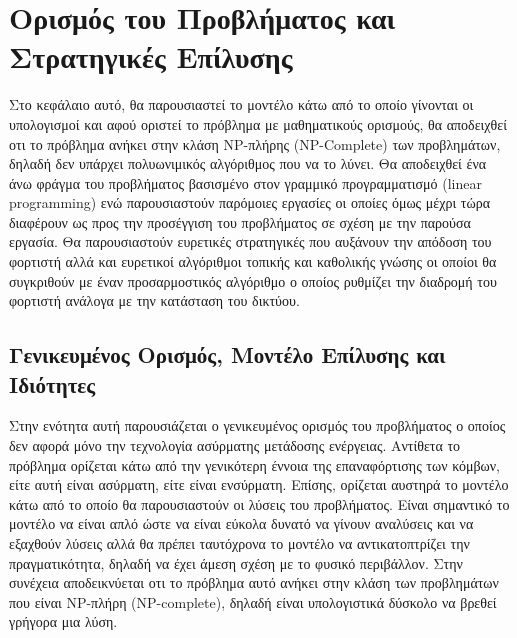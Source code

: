 

\chapter{Ορισμός του Προβλήματος και Στρατηγικές Επίλυσης} \label{ch:strategies_solution}
Στο κεφάλαιο αυτό, θα παρουσιαστεί το μοντέλο κάτω από το οποίο γίνονται οι υπολογισμοί και αφού οριστεί το πρόβλημα με μαθηματικούς ορισμούς, θα αποδειχθεί οτι το
πρόβλημα ανήκει στην κλάση NP-πλήρης (NP-Complete) των προβλημάτων, δηλαδή δεν υπάρχει πολυωνιμικός αλγόριθμος που να το λύνει. Θα αποδειχθεί ένα άνω φράγμα του
προβλήματος βασισμένο στον γραμμικό προγραμματισμό (linear programming) ενώ παρουσιαστούν παρόμοιες εργασίες οι οποίες όμως μέχρι τώρα διαφέρουν ως προς την
προσέγγιση του προβλήματος σε σχέση με την παρούσα εργασία. Θα παρουσιαστούν ευρετικές στρατηγικές που αυξάνουν την απόδοση του φορτιστή αλλά και ευρετικοί αλγόριθμοι
τοπικής και καθολικής γνώσης οι οποίοι θα συγκριθούν με έναν προσαρμοστικός αλγόριθμο ο οποίος ρυθμίζει την διαδρομή του φορτιστή ανάλογα με την κατάσταση του
δικτύου.


\section{Γενικευμένος Ορισμός, Μοντέλο Επίλυσης και Ιδιότητες}
Στην ενότητα αυτή παρουσιάζεται ο γενικευμένος ορισμός του προβλήματος ο οποίος δεν αφορά μόνο την τεχνολογία ασύρματης μετάδοσης ενέργειας. Αντίθετα το πρόβλημα
ορίζεται κάτω από την γενικότερη έννοια της επαναφόρτισης των κόμβων, είτε αυτή είναι ασύρματη, είτε είναι ενσύρματη. Επίσης, ορίζεται αυστηρά το μοντέλο κάτω από το
οποίο θα παρουσιαστούν οι λύσεις του προβλήματος. Είναι σημαντικό το μοντέλο να είναι απλό ώστε να είναι εύκολα δυνατό να γίνουν αναλύσεις και να εξαχθούν λύσεις
αλλά θα πρέπει ταυτόχρονα το μοντέλο να αντικατοπτρίζει την πραγματικότητα, δηλαδή να έχει άμεση σχέση με το φυσικό περιβάλλον. Στην συνέχεια αποδεικνύεται οτι το
πρόβλημα αυτό ανήκει στην κλάση των προβλημάτων που είναι NP-πλήρη (NP-complete), δηλαδή είναι υπολογιστικά δύσκολο να βρεθεί γρήγορα μια λύση.

